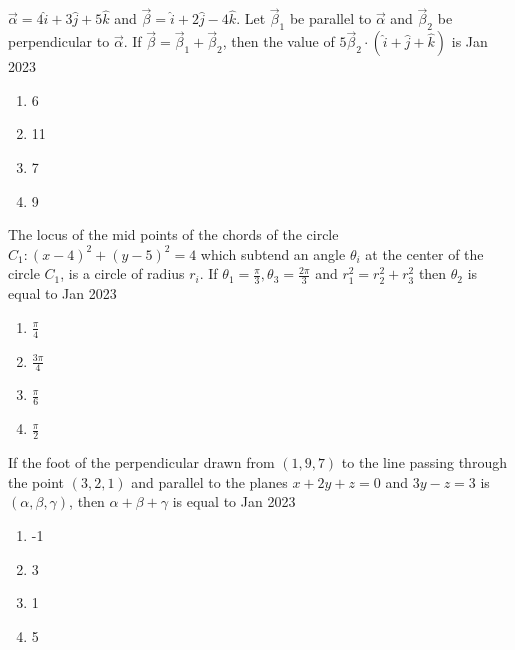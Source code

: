 \item $\overrightarrow{\alpha}=4\hat{i}+3\hat{j}+5\hat{k}$ and $ \overrightarrow{\beta}=\hat{i}+2\hat{j}-4\hat{k}$. Let  $\overrightarrow{\beta}_{1}$ be parallel to $\overrightarrow{\alpha}$ and $\overrightarrow{\beta}_{2}$ be perpendicular to $\overrightarrow{\alpha}$. If $\overrightarrow{\beta}=\overrightarrow{\beta}_{1}+\overrightarrow{\beta}_{2}$, then the value of $5\overrightarrow{\beta}_{2}\cdot(\hat{i}+\hat{j}+\hat{k})$ is
\hfill{Jan 2023}\begin{enumerate}
    \item 6
    \item 11
    \item 7
    \item 9
\end{enumerate}
\item The locus of the mid points of the chords of the
circle $C_{1}:(x-4)^{2}+(y-5)^{2}=4$ which subtend an angle $\theta_{i}$ at the center of the circle $C_{1}$, is a circle of radius $ r_{i}$. If $ \theta_{1}=\frac{\pi}{3},\theta_{3}=\frac{2\pi}{3} $ and $ r_{1}^{2}=r_{2}^{2}+r_{3}^{2}$ then $\theta_{2}$ is equal to  
\hfill{Jan 2023}\begin{enumerate}
    \item $\frac{\pi}{4}$
    \item $\frac{3\pi}{4}$
    \item $\frac{\pi}{6}$
    \item $\frac{\pi}{2}$

\end{enumerate}
\item If the foot of the perpendicular drawn from $(1, 9,
7)$ to the line passing through the point $(3, 2, 1)$ and
parallel to the planes $x + 2y + z = 0$ and $3y-z = 3$
is $(\alpha, \beta, \gamma)$, then $\alpha + \beta + \gamma$ is equal to
\hfill{Jan 2023}\begin{enumerate}
    \item -1
    \item 3
    \item 1
    \item 5
\end{enumerate}

